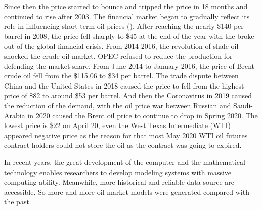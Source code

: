 Since then the price started to bounce and tripped the price in 18 months and continued to rise after 2003. The financial market began to gradually reflect its role in influencing short-term oil prices (\cite{huntington2013oil}). After reaching the nearly \$140 per barrel in 2008, the price fell sharply to \$45 at the end of the year with the broke out of the global financial crisis. From 2014-2016, the revolution of shale oil shocked the crude oil market. OPEC refused to reduce the production for defending the market share. From June 2014 to January 2016, the price of Brent crude oil fell from the \$115.06 to \$34 per barrel. The trade dispute between China and the United States in 2018 caused the price to fell from the highest price of \$82 to around \$53 per barrel. And then the Coronavirus in 2019 caused the reduction of the demand, with the oil price war between Russian and Saudi-Arabia in 2020 caused the Brent oil price to continue to drop in Spring 2020. The lowest price is \$22 on April 20, even the West Texas Intermediate (WTI) appeared negative price as the reason for that most May 2020 WTI oil futures contract holders could not store the oil as the contract was going to expired.

In recent years, the great development of the computer and the mathematical technology enables researchers to develop modeling systems with massive computing ability. Meanwhile, more historical and reliable data source are accessible. So more and more oil market models were generated compared with the past.
